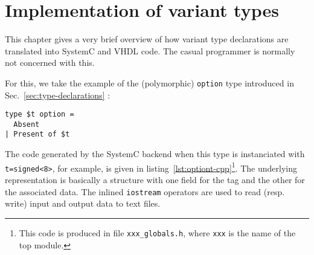 
\chapter{Implementation of variant types}
\label{cha:variants-impl}

This chapter gives a very brief overview of how \caph variant type declarations are translated into
SystemC and VHDL code. The casual programmer is normally not concerned with this.

For this, we take the example of the (polymorphic) \verb|option| type introduced in
Sec.~\ref{sec:type-declarations} :

\begin{verbatim}
type $t option = 
  Absent
| Present of $t
\end{verbatim}

\medskip The code generated by the SystemC backend when this type is instanciated with
\verb|t=signed<8>|, for example, is given in listing~\ref{lst:optiont-cpp}\footnote{This code is
  produced in file \texttt{xxx\_globals.h}, where \texttt{xxx} is the name of the top module.}. The
underlying representation is basically a structure with one field for the tag and the other for the
associated data. The inlined \texttt{iostream} operators are used to read (resp. write) input and
output data to text files.

